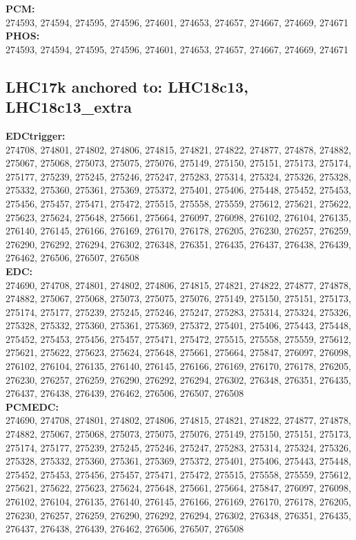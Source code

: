  \textbf{PCM:}\\
274593, 274594, 274595, 274596, 274601, 274653, 274657, 274667, 274669, 274671\\

 \textbf{PHOS:}\\
274593, 274594, 274595, 274596, 274601, 274653, 274657, 274667, 274669, 274671\\

 \subsection{LHC17k anchored to: LHC18c13, LHC18c13\_extra}

 \textbf{EDCtrigger:}\\
274708, 274801, 274802, 274806, 274815, 274821, 274822, 274877, 274878, 274882, 275067, 275068, 275073, 275075, 275076, 275149, 275150, 275151, 275173, 275174, 275177, 275239, 275245, 275246, 275247, 275283, 275314, 275324, 275326, 275328, 275332, 275360, 275361, 275369, 275372, 275401, 275406, 275448, 275452, 275453, 275456, 275457, 275471, 275472, 275515, 275558, 275559, 275612, 275621, 275622, 275623, 275624, 275648, 275661, 275664, 276097, 276098, 276102, 276104, 276135, 276140, 276145, 276166, 276169, 276170, 276178, 276205, 276230, 276257, 276259, 276290, 276292, 276294, 276302, 276348, 276351, 276435, 276437, 276438, 276439, 276462, 276506, 276507, 276508\\

 \textbf{EDC:}\\
274690, 274708, 274801, 274802, 274806, 274815, 274821, 274822, 274877, 274878, 274882, 275067, 275068, 275073, 275075, 275076, 275149, 275150, 275151, 275173, 275174, 275177, 275239, 275245, 275246, 275247, 275283, 275314, 275324, 275326, 275328, 275332, 275360, 275361, 275369, 275372, 275401, 275406, 275443, 275448, 275452, 275453, 275456, 275457, 275471, 275472, 275515, 275558, 275559, 275612, 275621, 275622, 275623, 275624, 275648, 275661, 275664, 275847, 276097, 276098, 276102, 276104, 276135, 276140, 276145, 276166, 276169, 276170, 276178, 276205, 276230, 276257, 276259, 276290, 276292, 276294, 276302, 276348, 276351, 276435, 276437, 276438, 276439, 276462, 276506, 276507, 276508\\

 \textbf{PCMEDC:}\\
274690, 274708, 274801, 274802, 274806, 274815, 274821, 274822, 274877, 274878, 274882, 275067, 275068, 275073, 275075, 275076, 275149, 275150, 275151, 275173, 275174, 275177, 275239, 275245, 275246, 275247, 275283, 275314, 275324, 275326, 275328, 275332, 275360, 275361, 275369, 275372, 275401, 275406, 275443, 275448, 275452, 275453, 275456, 275457, 275471, 275472, 275515, 275558, 275559, 275612, 275621, 275622, 275623, 275624, 275648, 275661, 275664, 275847, 276097, 276098, 276102, 276104, 276135, 276140, 276145, 276166, 276169, 276170, 276178, 276205, 276230, 276257, 276259, 276290, 276292, 276294, 276302, 276348, 276351, 276435, 276437, 276438, 276439, 276462, 276506, 276507, 276508\\


